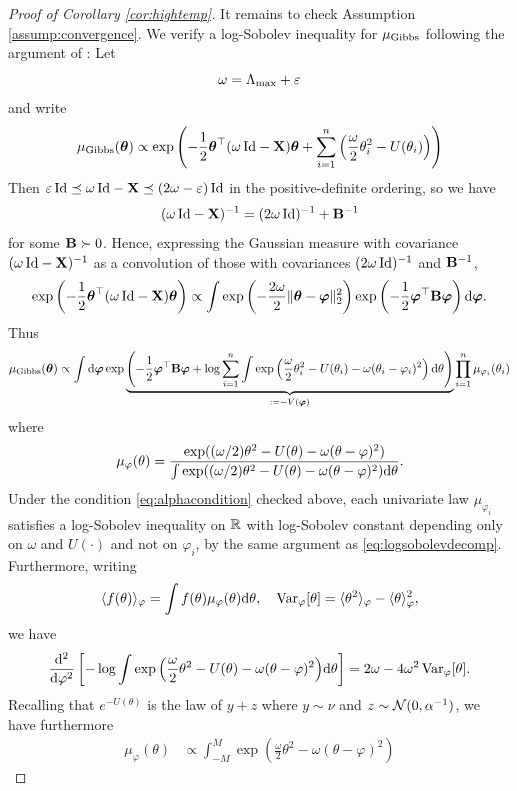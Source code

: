 \begin{proof}[Proof of Corollary \ref{cor:hightemp}]
It remains to check Assumption \ref{assump:convergence}. We verify a log-Sobolev inequality for
$\mu_{\mathrm{Gibbs}}$ following the argument of \cite{bauerschmidt2019very}: Let
\[\omega=\Lambda_{\max}+\varepsilon\]
and write
\[\mu_{\mathrm{Gibbs}}(\boldsymbol{\theta}) \propto
\exp\left({-}\frac{1}{2}\boldsymbol{\theta}^\top(\omega\,\mathrm{Id}-\mathbf{X})\boldsymbol{\theta}
+\sum_{i=1}^n \left(\frac{\omega}{2}\theta_i^2-U(\theta_i)\right)\right)\]
Then $\varepsilon\,\mathrm{Id} \preceq \omega\,\mathrm{Id}-\mathbf{X} \preceq (2\omega-\varepsilon)\,\mathrm{Id}$
in the positive-definite ordering, so we have
\[(\omega\,\mathrm{Id}-\mathbf{X})^{-1}=(2\omega\,\mathrm{Id})^{-1}+\mathbf{B}^{-1}\]
for some $\mathbf{B} \succ 0$. Hence,
expressing the Gaussian measure with covariance $(\omega\,\mathrm{Id}-\mathbf{X})^{-1}$
as a convolution of those with covariances $(2\omega\,\mathrm{Id})^{-1}$ and $\mathbf{B}^{-1}$,
\[\exp\left({-}\frac{1}{2}\boldsymbol{\theta}^\top(\omega\,\mathrm{Id}-\mathbf{X})\boldsymbol{\theta}\right)
\propto \int \exp\left({-}\frac{2\omega}{2}\|\boldsymbol{\theta}-\boldsymbol{\varphi}\|_2^2
\right)\exp\left({-}\frac{1}{2}\boldsymbol{\varphi}^\top \mathbf{B}\boldsymbol{\varphi}\right)\mathrm{d}\boldsymbol{\varphi}.\]
Thus
\begin{equation}\label{eq:measuredecomp}
\mu_{\mathrm{Gibbs}}(\boldsymbol{\theta}) \propto
\int \mathrm{d}\boldsymbol{\varphi} \exp\underbrace{\left({-}\frac{1}{2}\boldsymbol{\varphi}^\top \mathbf{B}\boldsymbol{\varphi}
+\log \sum_{i=1}^n
\int
\exp\left(\frac{\omega}{2}\theta_i^2-U(\theta_i)-\omega(\theta_i-\varphi_i)^2\right)\mathrm{d}\theta\right)}_{:={-}V(\boldsymbol{\varphi})}\prod_{i=1}^n
\mu_{\varphi_i}(\theta_i)
\end{equation}
where
\[\mu_\varphi(\theta)
=\frac{\exp((\omega/2)\theta^2-U(\theta)-\omega(\theta-\varphi)^2)}
{\int \exp((\omega/2)\theta^2-U(\theta)-\omega(\theta-\varphi)^2)\mathrm{d}\theta}.\]
Under the condition \eqref{eq:alphacondition} checked above, each univariate law
$\mu_{\varphi_i}$ satisfies a log-Sobolev inequality on $\mathbb{R}$ with
log-Sobolev constant depending only on $\omega$ and $U(\cdot)$ and not on
$\varphi_i$, by the same argument as \eqref{eq:logsobolevdecomp}. Furthermore,
writing
\[\langle f(\theta) \rangle_{\varphi}
=\int f(\theta)\mu_\varphi(\theta)\mathrm{d}\theta,\quad
\operatorname{Var}_{\varphi}[\theta]=\langle \theta^2 \rangle_{\varphi}-\langle \theta
\rangle_{\varphi}^2,\]
we have
\begin{equation}\label{eq:LSIderivativebound}
\frac{\mathrm{d}^2}{\mathrm{d}\varphi^2}
\left[{-}\log \int
\exp\Big(\frac{\omega}{2}\theta^2-U(\theta)-\omega(\theta-\varphi)^2\Big)\mathrm{d}\theta\right]
=2\omega-4\omega^2\operatorname{Var}_{\varphi}[\theta].
\end{equation}
Recalling that $e^{-U(\theta)}$ is the law of
$y+z$ where $y \sim \nu$ and $z \sim \mathcal{N}(0,\alpha^{-1})$, we have furthermore
\begin{align*}
\mu_\varphi(\theta)
&\propto \int_{-M}^M
\exp\left(\frac{\omega}{2}\theta^2-\omega(\theta-\varphi)^2\right)

\end{align*}
\end{proof}
